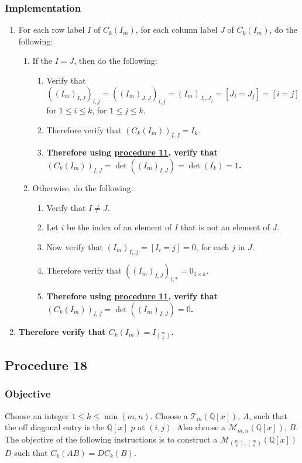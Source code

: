 \documentclass[twocolumn]{article}
\newcommand{\ul}[1]{\underline{#1}}
\begin{document}
			\subsubsection{Implementation}
				\begin{enumerate}
					\item For each row label $I$ of $C_k(I_m)$, for each column label $J$ of $C_k(I_m)$, do the following:
					\begin{enumerate}
						\item If the $I=J$, then do the following:
						\begin{enumerate}
							\item Verify that $((I_m)_{I,J})_{i,j}=((I_m)_{J,J})_{i,j}=(I_m)_{J_i,J_j}=[J_i=J_j]=[i=j]$ for $1\le i\le k$, for $1\le j\le k$.
							\item Therefore verify that $(C_k(I_m))_{\ul{I},\ul{J}}=I_k$.
							\item \textbf{Therefore using \hyperref[sec:procedure 11]{procedure 11}, verify that $(C_k(I_m))_{\ul{I},\ul{J}}=\det((I_m)_{I,J})=\det(I_k)=1$.}
						\end{enumerate}
						\item Otherwise, do the following:
						\begin{enumerate}
							\item Verify that $I\ne J$.
							\item Let $i$ be the index of an element of $I$ that is not an element of $J$.
							\item Now verify that $(I_m)_{I_i,j}=[I_i=j]=0$, for each $j$ in $J$.
							\item Therefore verify that $((I_m)_{I,J})_{i,*}=0_{1\times k}$.
							\item \textbf{Therefore using \hyperref[sec:procedure 11]{procedure 11}, verify that $(C_k(I_m))_{\ul{I},\ul{J}}=\det((I_m)_{I,J})=0$.}
						\end{enumerate}
					\end{enumerate}
					\item \textbf{Therefore verify that $C_k(I_m)=I_{\binom{m}{k}}$.}	
				\end{enumerate}
		\subsection{Procedure 18}\label{sec:procedure 18}
			\subsubsection{Objective}
				Choose an integer $1\le k\le\min(m,n)$. Choose a $\mathcal{T}_{m}(\mathbb{Q}[x])$, $A$, such that the off diagonal entry is the $\mathbb{Q}[x]$ $p$ at $(i,j)$. Also choose a $\mathcal{M}_{m,n}(\mathbb{Q}[x])$, $B$. The objective of the following instructions is to construct a $\mathcal{M}_{\binom{m}{k},\binom{m}{k}}(\mathbb{Q}[x])$ $D$ such that $C_k(AB)=DC_k(B)$.
\end{document}

